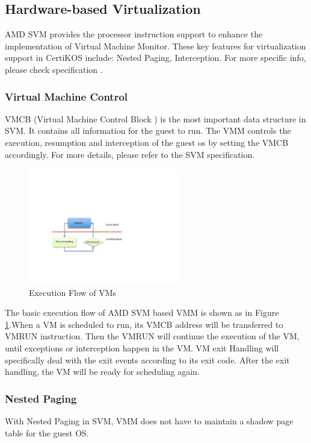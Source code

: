\documentclass[a4paper,12pt]{article}
\begin{document}
\subsection{ Hardware-based Virtualization}
AMD SVM provides the processor instruction support to enhance the implementation of Virtual Machine Monitor. These key features for virtualization support in CertiKOS include:  Nested Paging,  Interception.  For more specific info, please check specification \cite{AMD64, AMDSVM}.

\subsubsection{Virtual Machine Control}
VMCB  (Virtual Machine Control Block ) is the most important data structure in SVM.  It contains all information for the guest to run.  The VMM controls the  execution, resumption and interception of the guest os by setting the VMCB accordingly.  For more details, please refer to the SVM specification.

\begin{figure}[!ht]
 \centerline{
 \includegraphics[width=0.6\textwidth]{vm_flow}}
 \caption{Execution Flow of VMs} \label{fig:vmflow}
\end{figure}


The basic execution flow of AMD SVM based VMM is shown as in Figure \ref{fig:vmflow}.When a VM is scheduled to run, its VMCB address will  be transferred to VMRUN instruction. Then the VMRUN will continue the execution of the VM, until exceptions or interception happen in the VM.   VM exit Handling will specifically deal with the exit events according to its exit code. After the exit handling, the VM will be ready for scheduling again.



\subsubsection{Nested Paging}
With Nested Paging in SVM, VMM does not  have to maintain a shadow page table for the guest OS.
\end{document}
